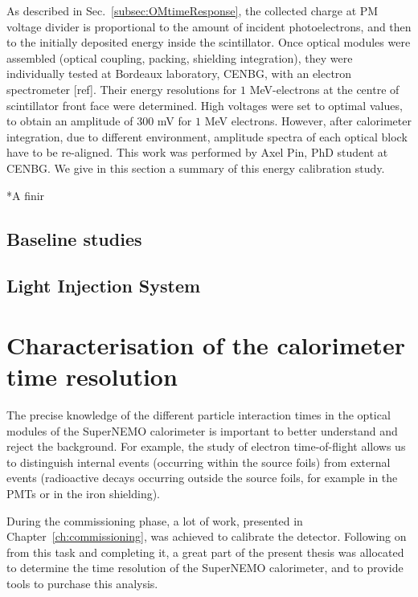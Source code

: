 As described in Sec.~\ref{subsec:OMtimeResponse}, the collected charge at PM voltage divider is proportional to the amount of incident photoelectrons, and then to the initially deposited energy inside the scintillator.
Once optical modules were assembled (optical coupling, packing, shielding integration), they were individually tested at Bordeaux laboratory, CENBG, with an electron spectrometer [ref].
Their energy resolutions for $1$ MeV-electrons at the centre of scintillator front face were determined.
High voltages were set to optimal values, to obtain an amplitude of $300$ mV for $1$ MeV electrons.
However, after calorimeter integration, due to different environment, amplitude spectra of each optical block have to be re-aligned.
This work was performed by Axel Pin, PhD student at CENBG.
We give in this section a summary of this energy calibration study.

*A finir\\




\section{Baseline studies}
\label{sec:comm_baseline}

\section{Light Injection System}
\label{sec:LI}






\chapter{Characterisation of the calorimeter time resolution}

The precise knowledge of the different particle interaction times in the optical modules of the SuperNEMO calorimeter is important to better understand and reject the background.
For example, the study of electron time-of-flight allows us to distinguish internal events (occurring within the source foils) from external events (radioactive decays occurring outside the source foils, for example in the PMTs or in the iron shielding).

During the commissioning phase, a lot of work, presented in Chapter~\ref{ch:commissioning}, was achieved to calibrate the detector.
Following on from this task and completing it, a great part of the present thesis was allocated to determine the time resolution of the SuperNEMO calorimeter, and to provide tools to purchase this analysis.


